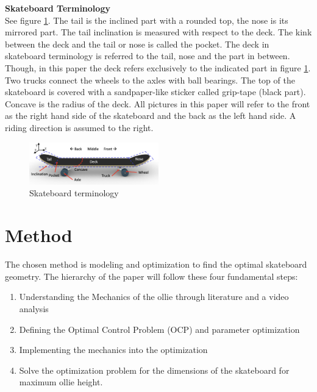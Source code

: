 \documentclass[default,iicol]{sn-jnl}
\theoremstyle{thmstyleone}%
\theoremstyle{thmstyletwo}%
\theoremstyle{thmstylethree}%
\begin{document}
\textbf{Skateboard Terminology}\\
See figure \ref{f_skateterminology}. The tail is the inclined part with a rounded top, the nose is its mirrored part. The tail inclination is measured with respect to the deck. The kink between the deck and the tail or nose is called the pocket. The deck in skateboard terminology is referred to the tail, nose and the part in between. Though, in this paper the deck refers exclusively to the indicated part in figure \ref{f_skateterminology}. Two trucks connect the wheels to the axles with ball bearings. The top of the skateboard is covered with a sandpaper-like sticker called grip-tape (black part). Concave is the radius of the deck. All pictures in this paper will refer to the front as the right hand side of the skateboard and the back as the left hand side. A riding direction is assumed to the right.

\begin{figure}[t]
\includegraphics[width=0.5\textwidth]{figure/terminology.png}
\caption[Skateboard terminology]{Skateboard terminology}
\label{f_skateterminology}
\end{figure}




\section{Method}

The chosen method is modeling and optimization to find the optimal skateboard geometry. The hierarchy of the paper will follow these four fundamental steps: 
\begin{enumerate}
    \item Understanding the Mechanics of the ollie through literature and a video analysis
    \item Defining the Optimal Control Problem (OCP) and parameter optimization
    \item Implementing the mechanics into the optimization
    \item Solve the optimization problem for the dimensions of the skateboard for maximum ollie height. 
\end{enumerate}
\end{document}
